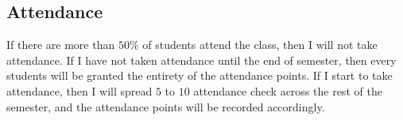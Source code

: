 \documentclass[12pt]{article}
\begin{document}
\subsection*{Attendance}
\label{sub:Attendance}

If there are more than $ 50\% $ of students attend the class, then I will not take attendance.
If I have not taken attendance until the end of semester, then every students will be granted the entirety of the attendance points.
If I start to take attendance, then I will spread $ 5 $ to $ 10 $ attendance check across the rest of the semester, and the attendance points will be recorded accordingly.


\end{document}
